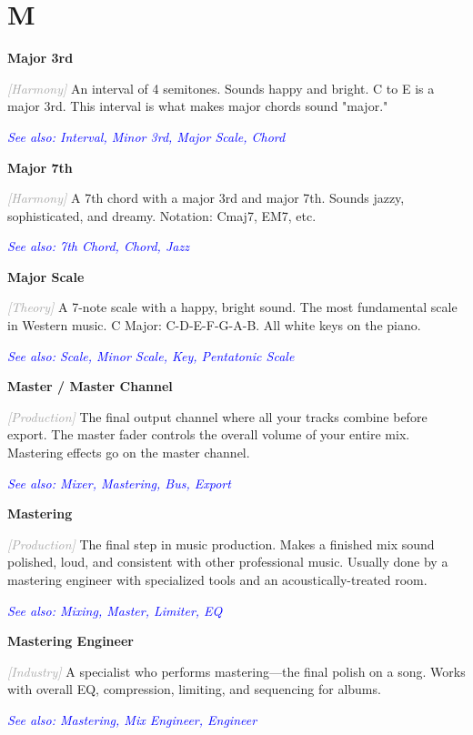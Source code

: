 \documentclass[11pt,letterpaper]{article}
\newcommand{\term}[1]{\textbf{\large\color{purple}#1}}
\newcommand{\category}[1]{\textcolor{darkgray}{\textit{\small [#1]}}}
\newcommand{\seealso}[1]{\textcolor{blue}{\textit{See also: #1}}}
\newenvironment{termdef}[1]
  {\noindent\term{#1}\par\nopagebreak}
  {\par\vspace{0.3em}}
\begin{document}
\newpage


\section*{M}

\begin{termdef}{Major 3rd}
\category{Harmony}
An interval of 4 semitones. Sounds happy and bright. C to E is a major 3rd. This interval is what makes major chords sound "major."

\seealso{Interval, Minor 3rd, Major Scale, Chord}
\end{termdef}

\begin{termdef}{Major 7th}
\category{Harmony}
A 7th chord with a major 3rd and major 7th. Sounds jazzy, sophisticated, and dreamy. Notation: Cmaj7, EM7, etc.

\seealso{7th Chord, Chord, Jazz}
\end{termdef}

\begin{termdef}{Major Scale}
\category{Theory}
A 7-note scale with a happy, bright sound. The most fundamental scale in Western music. C Major: C-D-E-F-G-A-B. All white keys on the piano.

\seealso{Scale, Minor Scale, Key, Pentatonic Scale}
\end{termdef}

\begin{termdef}{Master / Master Channel}
\category{Production}
The final output channel where all your tracks combine before export. The master fader controls the overall volume of your entire mix. Mastering effects go on the master channel.

\seealso{Mixer, Mastering, Bus, Export}
\end{termdef}

\begin{termdef}{Mastering}
\category{Production}
The final step in music production. Makes a finished mix sound polished, loud, and consistent with other professional music. Usually done by a mastering engineer with specialized tools and an acoustically-treated room.

\seealso{Mixing, Master, Limiter, EQ}
\end{termdef}

\begin{termdef}{Mastering Engineer}
\category{Industry}
A specialist who performs mastering—the final polish on a song. Works with overall EQ, compression, limiting, and sequencing for albums.

\seealso{Mastering, Mix Engineer, Engineer}
\end{termdef}
\end{document}
